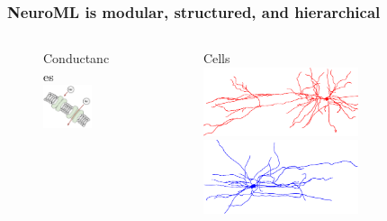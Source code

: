 \begin{frame}[c]
  \frametitle{NeuroML is modular, structured, and hierarchical}
  \begin{columns}
    \begin{column}{0.3\textwidth}
      \begin{figure}[h]
        \centering
        Conductances\\
        \includegraphics[width=0.7\textwidth]{99_images/membrane2}\\\vspace{0.2cm}
      \end{figure}%
    \end{column}
    \begin{column}{0.3\textwidth}
      \begin{figure}[h]
        \centering
        Cells\\\vspace{-0.5cm}
        \includegraphics[width=0.7\textwidth,angle=-90]{99_images/HL23PYR-red}
        \includegraphics[width=0.7\textwidth,angle=-90]{99_images/HL23PV}

\end{figure}
\end{column}
\end{columns}
\end{frame}
